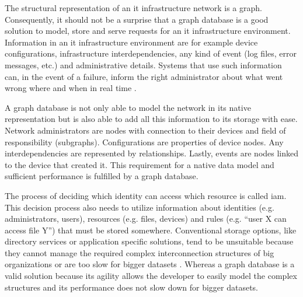 
The structural representation of an \gls{it} infrastructure network is a graph. Consequently, it should not be a surprise that a graph database is a good solution to model, store and serve requests for an \gls{it} infrastructure environment. Information in an \gls{it} infrastructure environment are for example device configurations, infrastructure interdependencies, any kind of event (log files, error messages, etc.) and administrative details. Systems that use such information can, in the event of a failure, inform the right administrator about what went wrong where and when in real time \autocite{neo4j:use_cases}.

A graph database is not only able to model the network in its native representation but is also able to add all this information to its storage with ease. Network administrators are nodes with connection to their devices and field of responsibility (subgraphs). Configurations are properties of device nodes. Any interdependencies are represented by relationships. Lastly, events are nodes linked to the device that created it. This requirement for a native data model and sufficient performance is fulfilled by a graph database.


The process of deciding which identity can access which resource is called \acrfull{iam}. This decision process also needs to utilize information about identities (e.g.  administrators, users), resources (e.g.  files, devices) and rules (e.g. “user X can access file Y”) that must be stored somewhere. Conventional storage options, like directory services or application specific solutions, tend to be unsuitable because they cannot manage the required complex interconnection structures of big organizations or are too slow for bigger datasets \autocite{neo4j:use_cases}.  Whereas a graph database is a valid solution because its agility allows the developer to easily model the complex structures and its performance does not slow down for bigger datasets.


